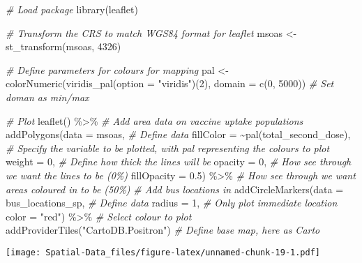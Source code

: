 \documentclass[
]{book}
\newenvironment{Shaded}{\begin{snugshade}}{\end{snugshade}}
\newcommand{\AttributeTok}[1]{\textcolor[rgb]{0.77,0.63,0.00}{#1}}
\newcommand{\CommentTok}[1]{\textcolor[rgb]{0.56,0.35,0.01}{\textit{#1}}}
\newcommand{\DecValTok}[1]{\textcolor[rgb]{0.00,0.00,0.81}{#1}}
\newcommand{\FloatTok}[1]{\textcolor[rgb]{0.00,0.00,0.81}{#1}}
\newcommand{\FunctionTok}[1]{\textcolor[rgb]{0.00,0.00,0.00}{#1}}
\newcommand{\NormalTok}[1]{#1}
\newcommand{\OtherTok}[1]{\textcolor[rgb]{0.56,0.35,0.01}{#1}}
\newcommand{\SpecialCharTok}[1]{\textcolor[rgb]{0.00,0.00,0.00}{#1}}
\newcommand{\StringTok}[1]{\textcolor[rgb]{0.31,0.60,0.02}{#1}}
\begin{document}
\begin{Shaded}
\begin{Highlighting}[]
\CommentTok{\# Load package}
\FunctionTok{library}\NormalTok{(leaflet)}

\CommentTok{\# Transform the CRS to match WGS84 format for leaflet}
\NormalTok{msoas }\OtherTok{\textless{}{-}} \FunctionTok{st\_transform}\NormalTok{(msoas, }\DecValTok{4326}\NormalTok{)}

\CommentTok{\# Define parameters for colours for mapping}
\NormalTok{pal }\OtherTok{\textless{}{-}} \FunctionTok{colorNumeric}\NormalTok{(}\FunctionTok{viridis\_pal}\NormalTok{(}\AttributeTok{option =} \StringTok{"viridis"}\NormalTok{)(}\DecValTok{2}\NormalTok{), }\AttributeTok{domain =} \FunctionTok{c}\NormalTok{(}\DecValTok{0}\NormalTok{, }\DecValTok{5000}\NormalTok{)) }\CommentTok{\# Set doman as min/max}

\CommentTok{\# Plot}
\FunctionTok{leaflet}\NormalTok{() }\SpecialCharTok{\%\textgreater{}\%}
  \CommentTok{\# Add area data on vaccine uptake populations}
  \FunctionTok{addPolygons}\NormalTok{(}\AttributeTok{data =}\NormalTok{ msoas, }\CommentTok{\# Define data}
              \AttributeTok{fillColor =} \SpecialCharTok{\textasciitilde{}}\FunctionTok{pal}\NormalTok{(total\_second\_dose), }\CommentTok{\# Specify the variable to be plotted, with pal representing the colours to plot}
              \AttributeTok{weight =} \DecValTok{0}\NormalTok{, }\CommentTok{\# Define how thick the lines will be }
              \AttributeTok{opacity =} \DecValTok{0}\NormalTok{, }\CommentTok{\# How see through we want the lines to be (0\%)}
              \AttributeTok{fillOpacity =} \FloatTok{0.5}\NormalTok{) }\SpecialCharTok{\%\textgreater{}\%} \CommentTok{\# How see through we want areas coloured in to be (50\%)}
  \CommentTok{\# Add bus locations in}
  \FunctionTok{addCircleMarkers}\NormalTok{(}\AttributeTok{data =}\NormalTok{ bus\_locations\_sp, }\CommentTok{\# Define data}
                   \AttributeTok{radius =} \DecValTok{1}\NormalTok{, }\CommentTok{\# Only plot immediate location}
                   \AttributeTok{color =} \StringTok{"red"}\NormalTok{) }\SpecialCharTok{\%\textgreater{}\%} \CommentTok{\# Select colour to plot}
  \FunctionTok{addProviderTiles}\NormalTok{(}\StringTok{"CartoDB.Positron"}\NormalTok{) }\CommentTok{\# Define base map, here as Carto}
\end{Highlighting}
\end{Shaded}

\texttt{[image: Spatial-Data\_files/figure-latex/unnamed-chunk-19-1.pdf]}
\end{document}
